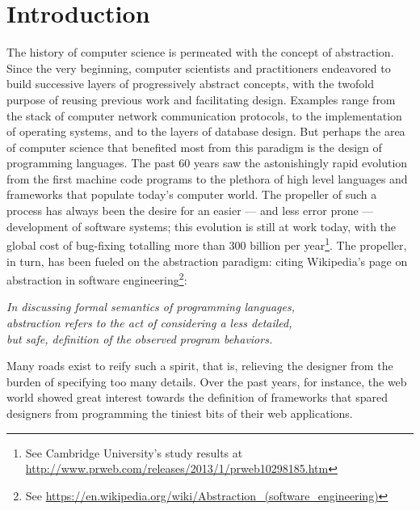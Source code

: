 \documentclass[12pt]{article} %
\begin{document}
\section{Introduction}
The history of computer science is permeated with the concept of abstraction. Since the very beginning, computer scientists and practitioners endeavored to build successive layers of progressively abstract concepts, with the twofold purpose of reusing previous work and facilitating design. Examples range from the stack of computer network communication protocols, to the implementation of operating systems, and to the layers of database design. But perhaps the area of computer science that benefited most from this paradigm is the design of programming languages. The past 60 years saw the astonishingly rapid evolution from the first machine code programs to the plethora of high level languages and frameworks that populate today's computer world. The propeller of such a process has always been the desire for an easier --- and less error prone --- development of software systems; this evolution is still at work today, with the global cost of bug-fixing totalling more than \textdollar{}300 billion per year\footnote{See Cambridge University's study results at \scriptsize\url{http://www.prweb.com/releases/2013/1/prweb10298185.htm}}. 
The propeller, in turn, has been fueled on the abstraction paradigm: citing Wikipedia's page on abstraction in software engineering\footnote{See \scriptsize\url{https://en.wikipedia.org/wiki/Abstraction_(software_engineering)}}:
\begin{shadequote*}
   \emph{In discussing formal semantics of programming languages, \\
   abstraction refers to the act of considering a less detailed, \\
   but safe, definition of the observed program behaviors.}
\end{shadequote*}
Many roads exist to reify such a spirit, that is, relieving the designer from the burden of specifying too many details. Over the past years, for instance, the web world showed great interest towards the definition of frameworks that spared designers from programming the tiniest bits of their web applications. 
\end{document}
